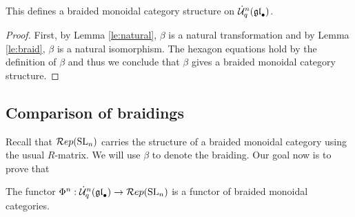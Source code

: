 \documentclass[11pt]{amsart}
\begin{document}
\begin{thm}
This defines a braided monoidal category structure on $ \dot{{\mathcal{U}}}_q^n({\mathfrak{gl}}_\bullet)$.
\end{thm}

\begin{proof}
First, by Lemma \ref{le:natural}, $\beta $ is a natural transformation and by Lemma \ref{le:braid}, $\beta $ is a natural isomorphism.  The hexagon equations hold by the definition of $ \beta $ and thus we conclude that $ \beta $ gives a braided monoidal category structure.
\end{proof}

\subsection{Comparison of braidings}
Recall that $ \mathcal{R}ep({\rm{SL}}_n) $ carries the structure of a braided monoidal category using the usual $R$-matrix.  We will use $ \beta $ to denote the braiding. Our goal now is to prove that
\begin{thm} \label{th:braiding}
The functor $ \Phi^n: \dot{{\mathcal{U}}}_q^n({\mathfrak{gl}}_\bullet) \rightarrow \mathcal{R}ep({\rm{SL}}_n) $ is a functor of braided monoidal categories.
\end{thm}
\end{document}
